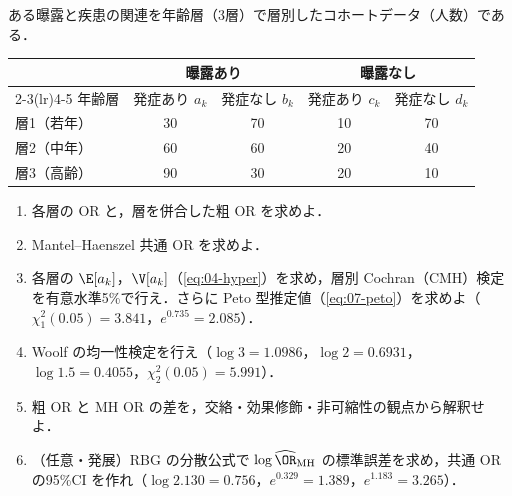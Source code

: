 \begin{reidai}[共通オッズ比の推定と粗 OR]\label{reidai:07-2}
ある曝露と疾患の関連を年齢層（3層）で層別したコホートデータ（人数）である．
\begin{center}\small
\begin{tabular}{@{}lcccc@{}}
\toprule
 & \multicolumn{2}{c}{曝露あり} & \multicolumn{2}{c}{曝露なし}\\
\cmidrule(lr){2-3}\cmidrule(lr){4-5}
年齢層 & 発症あり $a_k$ & 発症なし $b_k$ & 発症あり $c_k$ & 発症なし $d_k$\\
\midrule
層1（若年） & 30 & 70 & 10 & 70\\
層2（中年） & 60 & 60 & 20 & 40\\
層3（高齢） & 90 & 30 & 20 & 10\\
\bottomrule
\end{tabular}
\end{center}
\begin{enumerate}[label=(\arabic*)]
\item 各層の OR と，層を併合した粗 OR を求めよ．
\item Mantel--Haenszel 共通 OR を求めよ．
\item 各層の $\E[a_k]$，$\V[a_k]$（\cref{eq:04-hyper}）を求め，層別 Cochran（CMH）検定を有意水準5\%で行え．さらに Peto 型推定値（\cref{eq:07-peto}）を求めよ（$\chi^2_1(0.05)=3.841$，$e^{0.735}=2.085$）．
\item Woolf の均一性検定を行え（$\log3=1.0986$，$\log2=0.6931$，$\log1.5=0.4055$，$\chi^2_2(0.05)=5.991$）．
\item 粗 OR と MH OR の差を，交絡・効果修飾・非可縮性の観点から解釈せよ．
\item （任意・発展）RBG の分散公式で $\log\widehat\OR_{\mathrm{MH}}$ の標準誤差を求め，共通 OR の95\%CI を作れ（$\log2.130=0.756$，$e^{0.329}=1.389$，$e^{1.183}=3.265$）．
\end{enumerate}
\end{reidai}

